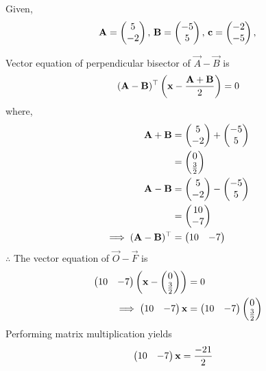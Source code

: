\documentclass[11pt]{book}
\begin{document}
\begin{enumerate}[label=\thesection.\arabic*.,ref=\thesection.\theenumi]
Given,
\begin{align}
\mathbf{A}=\begin{pmatrix}5 \\ -2\end{pmatrix},\,
\mathbf{B}=\begin{pmatrix}-5\\5\end{pmatrix},\,
	\mathbf{c}=\begin{pmatrix}-2\\-5\end{pmatrix},\,
\end{align}

Vector equation of perpendicular bisector of $\vec{A}-\vec{B}$ is
\begin{align}
 (\mathbf{A}-\mathbf{B})^\top  \left( \mathbf{x} - \frac{\mathbf{A}+\mathbf{B}}{2}\right) = 0
\end{align}
where,
\begin{align}
\mathbf{A}+\mathbf{B}&=\begin{pmatrix}5\\-2\end{pmatrix}+\begin{pmatrix}-5\\5\end{pmatrix}\\
&=\begin{pmatrix}0\\ \frac{3}{2}\end{pmatrix}\\
\mathbf{A}-\mathbf{B} &= \begin{pmatrix}5\\-2\end{pmatrix}-\begin{pmatrix}-5\\5\end{pmatrix}\\
&=\begin{pmatrix}10\\-7\end{pmatrix}\\
\implies (\mathbf{A}-\mathbf{B})^\top &= \begin{pmatrix}10&-7\end{pmatrix}
\end{align}
$\therefore $ The vector equation of $\vec{O}-\vec{F}$ is
\begin{align}
\begin{pmatrix}10&-7\end{pmatrix} \left( \mathbf{x}-\begin{pmatrix}0\\ \frac{3}{2}\end{pmatrix} \right)&=0\\
\implies \begin{pmatrix}10&-7\end{pmatrix}\mathbf{x}&=\begin{pmatrix}10&-7\end{pmatrix}\begin{pmatrix}0\\ \frac{3}{2}\end{pmatrix}
\end{align}
Performing matrix multiplication yields
\begin{align}
\begin{pmatrix}10&-7\end{pmatrix}\mathbf{x}&= \frac{-21}{2}
\end{align}\\


\end{enumerate}
\end{document}
